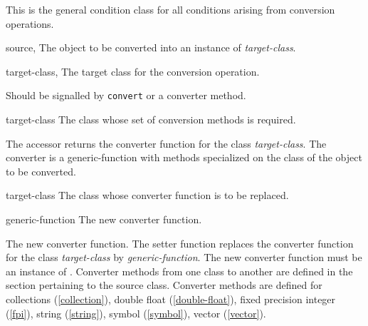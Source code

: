 \begin{optDefinition}
%
This is the general condition class for all conditions arising from conversion
operations.
%
\begin{initoptions}
    \item[source, \classref{object}] The object to be converted into an instance of
    {\em target-class}.
    \item[target-class, \classref{class}] The target class for the conversion
    operation.
\end{initoptions}
%
\remarks%
Should be signalled by {\tt convert} or a converter method.

%
\begin{arguments}
    \item[target-class] The class whose set of conversion methods is required.
\end{arguments}
%
\result%
The accessor returns the converter function for the class {\em
    target-class}.  The converter is a generic-function with methods specialized
on the class of the object to be converted.

%
\begin{arguments}
    \item[target-class] The class whose converter function is to be replaced.
    \item[generic-function] The new converter function.
\end{arguments}
%
\result%
The new converter function.  The setter function replaces the converter
function for the class {\em target-class\/} by {\em generic-function}.  The new
converter function must be an instance of {\tt <generic-function>}.
%
\remarks%
Converter methods from one class to another are defined in the section
pertaining to the source class.
%
\seealso%
Converter methods are defined for collections (\ref{collection}), double
float (\ref{double-float}), fixed precision integer (\ref{fpi}),
string (\ref{string}), symbol (\ref{symbol}), vector (\ref{vector}).
%
\end{optDefinition}
